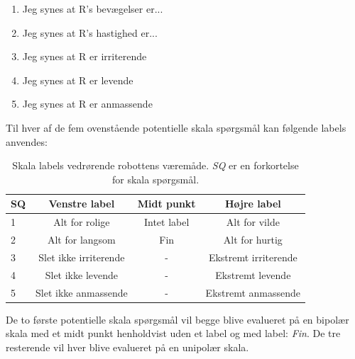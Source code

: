 %
\begin{enumerate}
  \item Jeg synes at R's bevægelser er... 
  \item Jeg synes at R's hastighed er... 
  \item Jeg synes at R er irriterende
  \item Jeg synes at R er levende
  \item Jeg synes at R er anmassende\blankline
\end{enumerate}
%
Til hver af de fem ovenstående potentielle skala spørgsmål kan følgende labels anvendes:
%
\begin{table}[H]
	\centering 
	\begin{tabular}{l|c|c|c}
		SQ     & Venstre label & Midt punkt & Højre label \\\hline
		1   & Alt for rolige & Intet label & Alt for vilde     \\\hline
		2   & Alt for langsom & Fin & Alt for hurtig   \\\hline
		3   & Slet ikke irriterende & - & Ekstremt irriterende \\\hline
	 	4   & Slet ikke levende & - & Ekstremt levende         \\\hline
		5   & Slet ikke anmassende & - & Ekstremt anmassende             
	\end{tabular}
	\caption{Skala labels vedrørende robottens væremåde. \textit{SQ} er en forkortelse for skala spørgsmål.}
	\label{tab:VaeremaadeSkala}
\end{table}
\noindent
%
De to første potentielle skala spørgsmål vil begge blive evalueret på en bipolær skala med et midt punkt henholdvist uden et label og med label: \textit{Fin}. De tre resterende vil hver blive evalueret på en unipolær skala.
%
